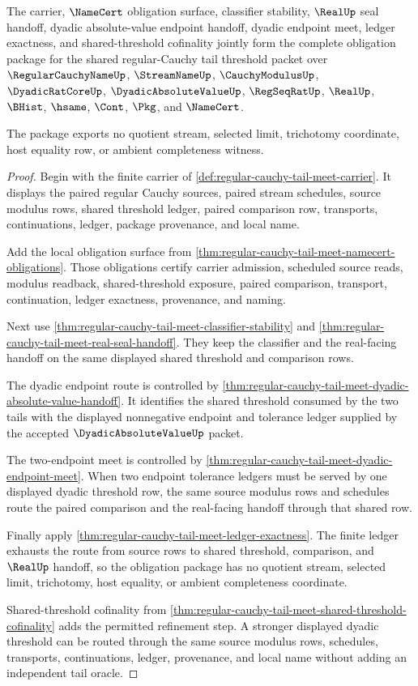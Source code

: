 \begin{theorem}
\label{thm:regular-cauchy-tail-meet-obligation-closure-package}
The carrier, $\NameCert$ obligation surface, classifier stability, $\RealUp$ seal handoff, dyadic absolute-value endpoint handoff, dyadic endpoint meet, ledger exactness, and shared-threshold cofinality jointly form the complete obligation package for the shared regular-Cauchy tail threshold packet over $\RegularCauchyNameUp$, $\StreamNameUp$, $\CauchyModulusUp$, $\DyadicRatCoreUp$, $\DyadicAbsoluteValueUp$, $\RegSeqRatUp$, $\RealUp$, $\BHist$, $\hsame$, $\Cont$, $\Pkg$, and $\NameCert$.

The package exports no quotient stream, selected limit, trichotomy coordinate, host equality row, or ambient completeness witness.
\end{theorem}
\begin{proof}
Begin with the finite carrier of \autoref{def:regular-cauchy-tail-meet-carrier}. It displays the paired regular Cauchy sources, paired stream schedules, source modulus rows, shared threshold ledger, paired comparison row, transports, continuations, ledger, package provenance, and local name.

Add the local obligation surface from \autoref{thm:regular-cauchy-tail-meet-namecert-obligations}. Those obligations certify carrier admission, scheduled source reads, modulus readback, shared-threshold exposure, paired comparison, transport, continuation, ledger exactness, provenance, and naming.

Next use \autoref{thm:regular-cauchy-tail-meet-classifier-stability} and \autoref{thm:regular-cauchy-tail-meet-real-seal-handoff}. They keep the classifier and the real-facing handoff on the same displayed shared threshold and comparison rows.

The dyadic endpoint route is controlled by \autoref{thm:regular-cauchy-tail-meet-dyadic-absolute-value-handoff}. It identifies the shared threshold consumed by the two tails with the displayed nonnegative endpoint and tolerance ledger supplied by the accepted $\DyadicAbsoluteValueUp$ packet.

The two-endpoint meet is controlled by \autoref{thm:regular-cauchy-tail-meet-dyadic-endpoint-meet}. When two endpoint tolerance ledgers must be served by one displayed dyadic threshold row, the same source modulus rows and schedules route the paired comparison and the real-facing handoff through that shared row.

Finally apply \autoref{thm:regular-cauchy-tail-meet-ledger-exactness}. The finite ledger exhausts the route from source rows to shared threshold, comparison, and $\RealUp$ handoff, so the obligation package has no quotient stream, selected limit, trichotomy, host equality, or ambient completeness coordinate.

Shared-threshold cofinality from \autoref{thm:regular-cauchy-tail-meet-shared-threshold-cofinality} adds the permitted refinement step. A stronger displayed dyadic threshold can be routed through the same source modulus rows, schedules, transports, continuations, ledger, provenance, and local name without adding an independent tail oracle.
\end{proof}

